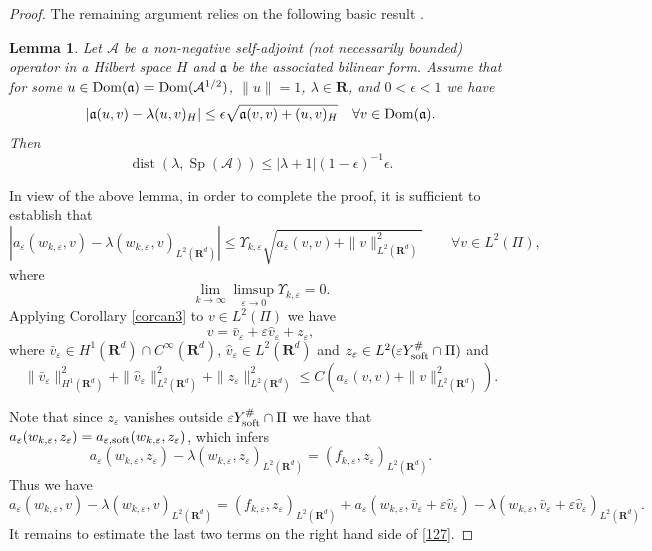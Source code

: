 \documentclass[11pt]{article}
\newcommand\e {\varepsilon}
\newcommand\soft{{\rm soft}}
\def\RR{\R}
\newcommand{\R}{\mathbf{R}}
\def\AA{\mathcal{A}}
\def\l{\lambda}
\DeclareMathOperator{\Sp}{Sp}
\newcommand\dist{\operatorname{dist}}
\newtheorem{lemma}[theorem]{Lemma}
\theoremstyle{remark}
\begin{document}
\begin{proof}
The remaining argument relies on the following basic result \cite[Lemma E.1]{CCV2019}.
\begin{lemma}\label{l5.9}
	Let $\AA$ be a   non-negative self-adjoint (not necessarily bounded) operator in a Hilbert space $H$ and $\mathfrak{a}$ be the associated bilinear form. Assume that for some $u\in {\rm Dom}(\mathfrak{a}) = {\rm Dom}(\AA^{1/2})$, $\|u\|=1$,  $\l\in \R$, and $0<\epsilon<1$ we have
	\[
	|\mathfrak{a}(u,v) - \l  (u,v)_H| \leq \epsilon \sqrt{\mathfrak{a}(v,v) + (u,v)_H} \quad \forall v\in {\rm Dom}(\mathfrak{a}).
	\]
	Then
	\begin{equation*}%
		\dist(\l,\Sp(\AA)) \leq |\l +1| (1-\epsilon)^{-1} \epsilon.
	\end{equation*}
\end{lemma}	
In view of the above lemma, in order to complete the proof, it is sufficient to establish that 	
\begin{equation} \label{sriest20}
	\left|a_\e(w_{k,\e},v)-\lambda ( w_{k,\e},v)_{L^2(\RR^d)}\right| \leq \Upsilon_{k,\e}\sqrt{a_\e (v,v)+\|v\|^2_{L^2(\RR^d)}} \qquad \forall v \in L^2(\Pi),
\end{equation}	
where
	\begin{equation*}
	\lim_{k \to \infty} \limsup_{\e \to 0} \Upsilon_{k,\e}=0. 	
\end{equation*} 	
Applying Corollary \ref{corcan3} to $ v \in L^2(\Pi)$ we have
$$
v=\bar{v}_\e  +\varepsilon \hat{v}_\e +z_\e ,
$$
where
$\bar{v}_\e  \in H^1(\RR^d)\cap C^\infty(\R^d)$, $\hat{v}_\e  \in L^2(\RR^d)$ and $z_\e \in L^2(\e Y_\soft^\# \cap \Pi)$ and
\begin{equation}\label{126a}
\|\bar{v}_\e \|^2_{H^1(\RR^d)} + \|\hat{v}_\e \|^2_{L^2(\RR^d)} + \|z_\e \|^2_{L^2(\RR^d)} \leq  C(a_\e (v,v)+\|v\|^2_{L^2(\RR^d)}).
\end{equation}

Note that since $z_\e$ vanishes outside $\e Y_\soft^\# \cap \Pi$ we have that
$a_\e(w_{k,\e},z_\e)=a_{\e,\soft}(w_{k,\e},z_\e)$, which infers  	
\begin{equation*}
	a_\e(w_{k,\e},z_\e) - \lambda ( w_{k,\e},z_\e)_{L^2(\RR^d)} =  (f_{k,\e},z_\e)_{L^2(\RR^d)}.
\end{equation*} 	
Thus we have
\begin{equation} \label{127}
a_\e(w_{k,\e},v)-\lambda ( w_{k,\e},v)_{L^2(\RR^d)} = (f_{k,\e},z_\e)_{L^2(\RR^d)} + a_\e(w_{k,\e},\bar{v}_\e  +\varepsilon \hat{v}_\e) - \lambda ( w_{k,\e},\bar{v}_\e  +\varepsilon \hat{v}_\e)_{L^2(\RR^d)}.
\end{equation}		
It remains to estimate the last two terms on the right hand side of \eqref{127}.


\end{proof}
\end{document}
